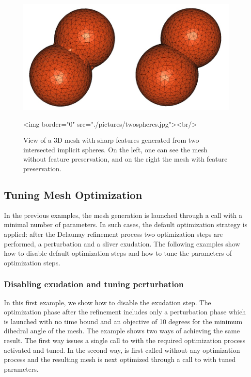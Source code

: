 \begin{figure}[ht]
\begin{center}
 \begin{ccTexOnly}
   \includegraphics[width=12cm]{Mesh_3/pictures/twospheres}
 \end{ccTexOnly}
 \begin{ccHtmlOnly}
   <img border="0" src="./pictures/twospheres.jpg"><br/>
 \end{ccHtmlOnly}
 \caption{View of a 3D mesh with sharp features generated from two intersected
 implicit spheres. On the left, one can see the mesh without feature preservation,
 and on the right the mesh with feature preservation.}
  \label{figure:two_spheres_mesh}
\end{center}
\end{figure}


\subsection{Tuning Mesh Optimization}
\label{Mesh_3_subsection_examples_optimization}

In the previous examples, the mesh generation is launched through a  call
 with a minimal number of parameters. In such cases, 
the default optimization strategy is applied: after the Delaunay refinement process
 two optimization steps are performed, a perturbation and  a sliver exudation.
The following examples show how to disable default optimization steps 
and how to tune the parameters of optimization steps.



\subsubsection{Disabling exudation and tuning perturbation}

In this first example, we show how to disable the exudation step.
The optimization phase after the refinement includes only
a perturbation phase which is launched  with no time bound
and an objective of 10 degrees for the minimum dihedral angle
of the mesh.
The example shows two ways of achieving the same result. The first way
issues a single call to  with the required optimization 
process activated and tuned. In the second way,  is first called
without any optimization process and the resulting mesh is next optimized
through a call to  with tuned parameters.


